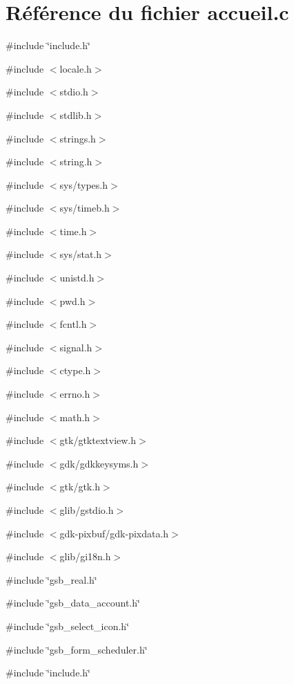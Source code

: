 \section{Référence du fichier accueil.c}
\label{accueil_8c}
{\ttfamily \#include \char`\"{}include.h\char`\"{}}\par
{\ttfamily \#include $<$locale.h$>$}\par
{\ttfamily \#include $<$stdio.h$>$}\par
{\ttfamily \#include $<$stdlib.h$>$}\par
{\ttfamily \#include $<$strings.h$>$}\par
{\ttfamily \#include $<$string.h$>$}\par
{\ttfamily \#include $<$sys/types.h$>$}\par
{\ttfamily \#include $<$sys/timeb.h$>$}\par
{\ttfamily \#include $<$time.h$>$}\par
{\ttfamily \#include $<$sys/stat.h$>$}\par
{\ttfamily \#include $<$unistd.h$>$}\par
{\ttfamily \#include $<$pwd.h$>$}\par
{\ttfamily \#include $<$fcntl.h$>$}\par
{\ttfamily \#include $<$signal.h$>$}\par
{\ttfamily \#include $<$ctype.h$>$}\par
{\ttfamily \#include $<$errno.h$>$}\par
{\ttfamily \#include $<$math.h$>$}\par
{\ttfamily \#include $<$gtk/gtktextview.h$>$}\par
{\ttfamily \#include $<$gdk/gdkkeysyms.h$>$}\par
{\ttfamily \#include $<$gtk/gtk.h$>$}\par
{\ttfamily \#include $<$glib/gstdio.h$>$}\par
{\ttfamily \#include $<$gdk-\/pixbuf/gdk-\/pixdata.h$>$}\par
{\ttfamily \#include $<$glib/gi18n.h$>$}\par
{\ttfamily \#include \char`\"{}gsb\_\-real.h\char`\"{}}\par
{\ttfamily \#include \char`\"{}gsb\_\-data\_\-account.h\char`\"{}}\par
{\ttfamily \#include \char`\"{}gsb\_\-select\_\-icon.h\char`\"{}}\par
{\ttfamily \#include \char`\"{}gsb\_\-form\_\-scheduler.h\char`\"{}}\par
{\ttfamily \#include \char`\"{}include.h\char`\"{}}\par
